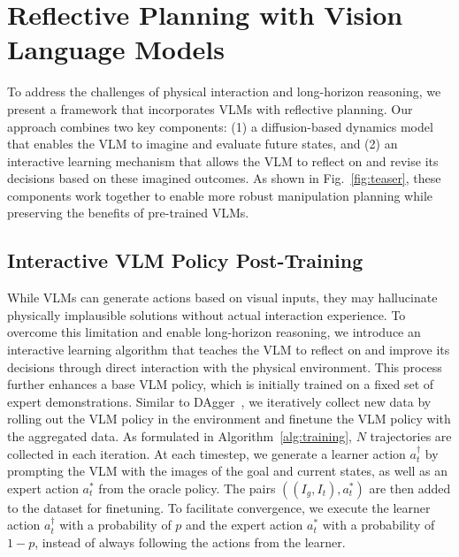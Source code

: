 \section{Reflective Planning with Vision Language Models}\label{sec:methods}
To address the challenges of physical interaction and long-horizon reasoning, we present a framework that incorporates VLMs with reflective planning. Our approach combines two key components: (1) a diffusion-based dynamics model that enables the VLM to imagine and evaluate future states, and (2) an interactive learning mechanism that allows the VLM to reflect on and revise its decisions based on these imagined outcomes. As shown in Fig.~\ref{fig:teaser}, these components work together to enable more robust manipulation planning while preserving the benefits of pre-trained VLMs.

\subsection{Interactive VLM Policy Post-Training}\label{sec:policy_training}
While VLMs can generate actions based on visual inputs, they may hallucinate physically implausible solutions without actual interaction experience. %
To overcome this limitation and enable long-horizon reasoning, we introduce an interactive learning algorithm that teaches the VLM to reflect on and improve its decisions through direct interaction with the physical environment. This process further enhances a base VLM policy, which is initially trained on a fixed set of expert demonstrations.
Similar to DAgger~\citep{dagger}, we iteratively collect new data by rolling out the VLM policy in the environment and finetune the VLM policy with the aggregated data. As formulated in Algorithm~\ref{alg:training}, $N$ trajectories are collected in each iteration. At each timestep, we generate a learner action $a_t^\dag$ by prompting the VLM with the images of the goal and current states, as well as an expert action $a_t^*$ from the oracle policy. The pairs $((I_g, I_t), a_t^*)$ are then added to the dataset for finetuning. To facilitate convergence, we execute the learner action $a_t^\dag$ with a probability of $p$ and the expert action $a_t^*$ with a probability of $1-p$, instead of always following the actions from the learner. 

